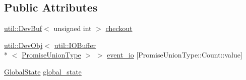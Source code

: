 \subsection*{Public Attributes}
\begin{DoxyCompactItemize}
\item 
\hyperlink{classutil_1_1DevBuf}{util\-::\-Dev\-Buf}$<$ unsigned int $>$ \hyperlink{structEventProgram_3_01PromiseUnion_3_01FN__IDS_8_8_8_4_00	PROGRAM__STATE_00	ADR__TYPE_00	GROUP__SIZE_01_4_1_1Instance_aa5d97b7a998020f9af259463286b2940}{checkout}
\item 
\hyperlink{classutil_1_1DevObj}{util\-::\-Dev\-Obj}$<$ \hyperlink{structutil_1_1IOBuffer}{util\-::\-I\-O\-Buffer}\\*
$<$ \hyperlink{structEventProgram_3_01PromiseUnion_3_01FN__IDS_8_8_8_4_00	PROGRAM__STATE_00	ADR__TYPE_00	GROUP__SIZE_01_4_a1fe05fa4e2892fa52fec81a89acf6cfb}{Promise\-Union\-Type} $>$ $>$ \hyperlink{structEventProgram_3_01PromiseUnion_3_01FN__IDS_8_8_8_4_00	PROGRAM__STATE_00	ADR__TYPE_00	GROUP__SIZE_01_4_1_1Instance_a55edcd0c9fa36ec30fd2dad85fea6fe4}{event\-\_\-io} \mbox{[}Promise\-Union\-Type\-::\-Count\-::value\mbox{]}
\item 
\hyperlink{structEventProgram_3_01PromiseUnion_3_01FN__IDS_8_8_8_4_00	PROGRAM__STATE_00	ADR__TYPE_00	GROUP__SIZE_01_4_a6686ae41c222fa163dbe5a3a53983186}{Global\-State} \hyperlink{structEventProgram_3_01PromiseUnion_3_01FN__IDS_8_8_8_4_00	PROGRAM__STATE_00	ADR__TYPE_00	GROUP__SIZE_01_4_1_1Instance_a8fcc46c017816768787913561b8513a9}{global\-\_\-state}
\end{DoxyCompactItemize}


